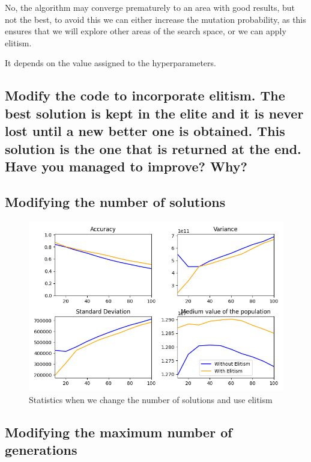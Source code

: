 \documentclass{article}
\begin{document}
    No, the algorithm may converge prematurely to an area with good results, but not the best, to avoid this we can either
    increase the mutation probability, as this ensures that we will explore other areas of the search space, or we can apply elitism.
    
    It depends on the value assigned to the hyperparameters.

    \subsection{Modify the code to incorporate elitism. The best solution is kept in the elite and it
    is never lost until a new better one is obtained. This solution is the one that is
    returned at the end. Have you managed to improve? Why?}


    \subsection*{Modifying the number of solutions}

    \begin{figure}[H]

        \centering
        \includegraphics[width=1\textwidth]{../media/ej1/01.NSolutions_withElitism_behaviour.png}
        \caption{Statistics when we change the number of solutions and use elitism}
        \label{Statistics when we change the number of solutions and use elitism}

    \end{figure}

   
    \subsection*{Modifying the maximum number of generations}
\end{document}
